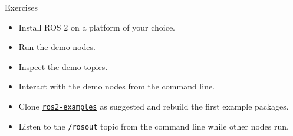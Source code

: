 \begin{frame}{Exercises}
  \begin{itemize}
    \item Install ROS 2 on a platform of your choice.
    \item Run the \href{https://docs.ros.org/en/jazzy/Installation/Ubuntu-Install-Debs.html\#try-some-examples}{\color{blue}\underline{demo nodes}}.
    \item Inspect the demo topics.
    \item Interact with the demo nodes from the command line.
    \item Clone \href{https://github.com/IntelligentSystemsLabUTV/ros2-examples}{\color{blue}\underline{\texttt{ros2-examples}}} as suggested and rebuild the first example packages.
    \item Listen to the \texttt{/rosout} topic from the command line while other nodes run.
  \end{itemize}
\end{frame}
